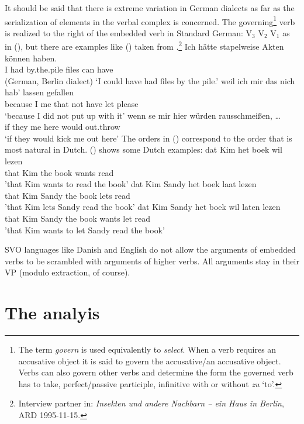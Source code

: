 It should be said that there is extreme variation in German dialects as far as the serialization
of elements in the verbal complex is concerned. The governing\footnote{
  The term \emph{govern} is used equivalently to \emph{select}. When a verb requires an accusative
  object it is said to govern the accusative/an accusative object. Verbs can also govern other verbs
  and determine the form the governed verb has to take, \eg perfect/passive participle, infinitive
  with or without \emph{zu} `to'. 
} verb is realized to the right of the
embedded verb in Standard German: V$_3$ V$_2$ V$_1$ as in (), but there are examples like
() taken from .\footnote{
Interview partner in: \emph{Insekten und andere Nachbarn -- ein Haus in Berlin}, ARD 1995-11-15.
}
\eal
\ex 
\gll Ich hätte stapelweise Akten kön\-nen haben.\\
     I   had   by.the.pile files can      have\\\hfill (German, Berlin dialect)
\glt `I could have had files by the pile.'
\ex 
\gll weil ich mir das  nich hab' lassen gefallen\\
     because I me that not  have let    please\\
\glt `because I did not put up with it'
\ex 
\gll wenn se   mir hier würden rausschmeißen, \ldots\\
     if   they me  here would  out.throw\\
\glt `if they would kick me out here'
\zl
The orders in () correspond to the order that is most natural in Dutch. () shows some
Dutch examples: 
\eal
\ex
\gll dat   Kim het boek wil lezen\\
     that  Kim the book wants read\\
\glt 'that Kim wants to read the book' 
\ex
\gll dat  Kim Sandy het boek laat lezen\\
     that Kim Sandy the book lets read\\
\glt 'that Kim lets Sandy read the book'
\ex 
\gll dat Kim Sandy het boek wil laten lezen\\
     that Kim Sandy the book wants let read \\
\glt 'that Kim wants to let Sandy read the book'
\zl

SVO languages like Danish and English do not allow the arguments of embedded verbs to be scrambled
with arguments of higher verbs. All arguments stay in their VP (modulo extraction, of course).


\section{The analyis}


